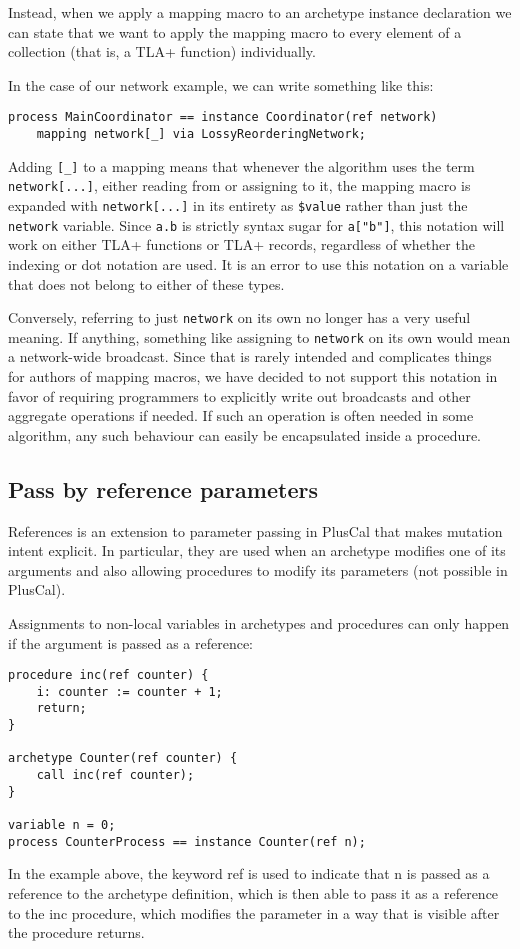 Instead, when we apply a mapping macro to an archetype instance declaration we can state that we want to apply the mapping macro to every element of a collection (that is, a TLA+ function) individually.

In the case of our network example, we can write something like this:
\begin{lstlisting}[language=pcal]
process MainCoordinator == instance Coordinator(ref network)
    mapping network[_] via LossyReorderingNetwork;
\end{lstlisting}

Adding \lstinline|[_]| to a mapping means that whenever the algorithm uses the term \lstinline|network[...]|, either reading from or assigning to it, the mapping macro is expanded with \lstinline|network[...]| in its entirety as \lstinline|$value| rather than just the \lstinline|network| variable. Since \lstinline|a.b| is strictly syntax sugar for \lstinline|a["b"]|, this notation will work on either TLA+ functions or TLA+ records, regardless of whether the indexing or dot notation are used. It is an error to use this notation on a variable that does not belong to either of these types.

Conversely, referring to just \lstinline|network| on its own no longer has a very useful meaning. If anything, something like assigning to \lstinline|network| on its own would mean a network-wide broadcast. Since that is rarely intended and complicates things for authors of mapping macros, we have decided to not support this notation in favor of requiring programmers to explicitly write out broadcasts and other aggregate operations if needed. If such an operation is often needed in some algorithm, any such behaviour can easily be encapsulated inside a procedure.

\subsection{Pass by reference parameters}
\label{passbyref}

References is an extension to parameter passing in PlusCal that makes mutation intent explicit. In particular, they are used when an archetype modifies one of its arguments and also allowing procedures to modify its parameters (not possible in PlusCal).

Assignments to non-local variables in archetypes and procedures can only happen if the argument is passed as a reference:

\begin{lstlisting}[language=pcal]
procedure inc(ref counter) {
    i: counter := counter + 1;
    return;
}

archetype Counter(ref counter) {
    call inc(ref counter);
}

variable n = 0;
process CounterProcess == instance Counter(ref n);
\end{lstlisting}

In the example above, the keyword ref is used to indicate that n is passed as a reference to the archetype definition, which is then able to pass it as a reference to the inc procedure, which modifies the parameter in a way that is visible after the procedure returns.
